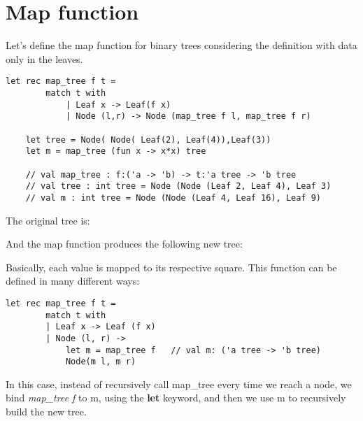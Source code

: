 \section{Map function}
Let's define the map function for binary trees considering the definition with data only in the leaves.
\begin{lstlisting}[style = FSharpStyle]
    let rec map_tree f t = 
        match t with
            | Leaf x -> Leaf(f x)
            | Node (l,r) -> Node (map_tree f l, map_tree f r)

    let tree = Node( Node( Leaf(2), Leaf(4)),Leaf(3))
    let m = map_tree (fun x -> x*x) tree

    // val map_tree : f:('a -> 'b) -> t:'a tree -> 'b tree
    // val tree : int tree = Node (Node (Leaf 2, Leaf 4), Leaf 3)
    // val m : int tree = Node (Node (Leaf 4, Leaf 16), Leaf 9)
\end{lstlisting}
The original tree is:\newline
{}\newline
And the map function produces the following new tree:\newline
{}\newline
Basically, each value is mapped to its respective square.\newline\newline
This function can be defined in many different ways:
\begin{lstlisting}[style = FSharpStyle]
    let rec map_tree f t = 
        match t with
        | Leaf x -> Leaf (f x)
        | Node (l, r) ->
            let m = map_tree f   // val m: ('a tree -> 'b tree)
            Node(m l, m r)
\end{lstlisting}
In this case, instead of recursively call map\_tree every time we reach a node, we bind \textit{map\_tree f} to m, using the \textbf{let} keyword, and then we use m to recursively build the new tree.\newline\newline
